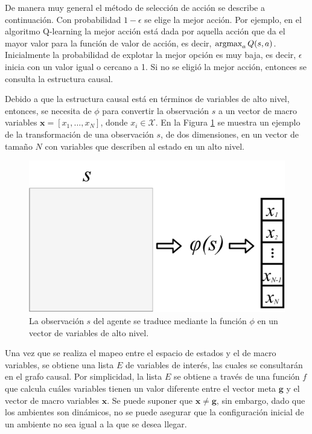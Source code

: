 De manera muy general el método de selección de acción se describe a continuación. 
Con probabilidad $1-\epsilon$ se elige la mejor acción. Por ejemplo, en el algoritmo Q-learning la mejor acción está dada por aquella acción que da el mayor valor para la función de valor de acción, es decir,  $\operatorname*{argmax}_a Q(s, a)$.
Inicialmente la probabilidad de
explotar la mejor opción es muy baja, es decir, $\epsilon$ inicia con un valor igual o cercano a 1.
Si no se eligió la mejor acción, entonces se consulta la estructura causal.

Debido a que la estructura causal está en términos de variables de alto nivel,
entonces, se necesita de $\phi$ para  convertir la observación $s$ a un vector de macro variables $\mathbf{x} = [x_1, \dots, x_N]$, donde $x_i \in \mathcal{X}$. En la Figura \ref{fig:obs-to-macro} se muestra un ejemplo de la transformación de una observación $s$, de dos dimensiones, en un vector de tamaño $N$ con variables que describen al estado en un alto nivel.

\begin{figure}[h]
    \centering
    \includegraphics[scale=0.25]{Chapter4/Figs/stox.pdf}
    \caption{La observación $s$ del agente se traduce mediante la función $\phi$ en un vector de variables de alto nivel.}
    \label{fig:obs-to-macro}
\end{figure}

Una vez que se
realiza el mapeo entre el espacio de
estados y el de macro variables, se obtiene una lista  $E$ de variables de interés, las cuales se consultarán en el grafo causal.
Por simplicidad, la lista $E$ se obtiene a través de una función $f$ que calcula cuáles variables tienen un valor diferente entre el vector meta $\mathbf{g}$
y el vector de macro variables $\mathbf{x}$. Se puede suponer que $\mathbf{x} \neq \mathbf{g}$, sin embargo, dado que los ambientes son dinámicos, no se puede asegurar que la configuración inicial de un ambiente no sea igual a la que se desea llegar. 


